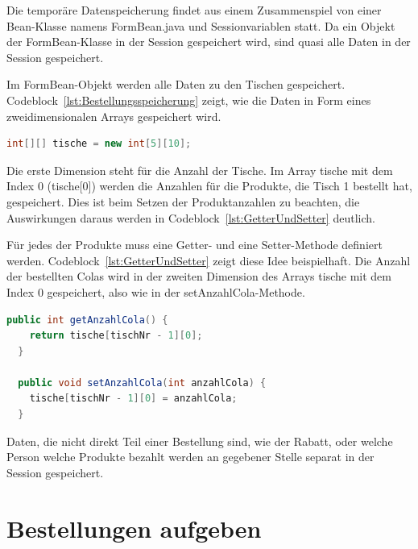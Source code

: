 Die temporäre Datenspeicherung findet aus einem Zusammenspiel von einer Bean-Klasse namens FormBean.java und Sessionvariablen statt.
Da ein Objekt der FormBean-Klasse in der Session gespeichert wird, sind quasi alle Daten in der Session gespeichert.

Im FormBean-Objekt werden alle Daten zu den Tischen gespeichert.
Codeblock~\ref{lst:Bestellungsspeicherung} zeigt, wie die Daten in Form eines zweidimensionalen Arrays gespeichert wird.

\begin{lstlisting}[language=java, caption=Bestellungsspeicherung, label=lst:Bestellungsspeicherung]
  int[][] tische = new int[5][10];
\end{lstlisting}

Die erste Dimension steht für die Anzahl der Tische.
Im Array tische mit dem Index 0 (tische[0]) werden die Anzahlen für die Produkte, die Tisch 1 bestellt hat, gespeichert.
Dies ist beim Setzen der Produktanzahlen zu beachten, die Auswirkungen daraus werden in Codeblock~\ref{lst:GetterUndSetter} deutlich.

Für jedes der Produkte muss eine Getter- und eine Setter-Methode definiert werden.
Codeblock~\ref{lst:GetterUndSetter} zeigt diese Idee beispielhaft.
Die Anzahl der bestellten Colas wird in der zweiten Dimension des Arrays tische mit dem Index 0 gespeichert, also wie in der setAnzahlCola-Methode.

\begin{lstlisting}[language=java, caption=Beispiel für Getter- und Setter-Methoden, label=lst:GetterUndSetter]
  public int getAnzahlCola() {
    return tische[tischNr - 1][0];
  }

  public void setAnzahlCola(int anzahlCola) {
    tische[tischNr - 1][0] = anzahlCola;
  }
\end{lstlisting}

Daten, die nicht direkt Teil einer Bestellung sind, wie der Rabatt, oder welche Person welche Produkte bezahlt werden an gegebener Stelle separat in der Session gespeichert.


\section{Bestellungen aufgeben} %
\label{sec:Bestellungen aufgeben}

